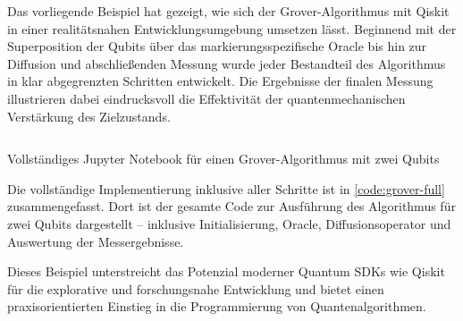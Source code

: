 Das vorliegende Beispiel hat gezeigt, wie sich der Grover-Algorithmus mit Qiskit in einer realitätsnahen Entwicklungsumgebung umsetzen lässt. Beginnend mit der Superposition der Qubits über das markierungsspezifische Oracle bis hin zur Diffusion und abschließenden Messung wurde jeder Bestandteil des Algorithmus in klar abgegrenzten Schritten entwickelt. Die Ergebnisse der finalen Messung illustrieren dabei eindrucksvoll die Effektivität der quantenmechanischen Verstärkung des Zielzustands.

\begin{listing}[ht!]
  \inputminted{python}{code/grover-full.py}
  \caption{Vollständiges Jupyter Notebook für einen Grover-Algorithmus mit zwei Qubits}
  \label{code:grover-full}
\end{listing}

Die vollständige Implementierung inklusive aller Schritte ist in \autoref{code:grover-full} zusammengefasst. Dort ist der gesamte Code zur Ausführung des Algorithmus für zwei Qubits dargestellt – inklusive Initialisierung, Oracle, Diffusionsoperator und Auswertung der Messergebnisse.

Dieses Beispiel unterstreicht das Potenzial moderner Quantum SDKs wie Qiskit für die explorative und forschungsnahe Entwicklung und bietet einen praxisorientierten Einstieg in die Programmierung von Quantenalgorithmen.

\clearpage
\printbibliography
